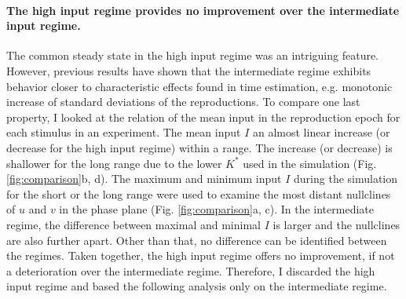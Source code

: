 \documentclass[10pt]{article}
\begin{document}
\paragraph{The high input regime provides no improvement over the intermediate input regime.}
The common steady state in the high input regime was an intriguing feature.
However, previous results have shown that the intermediate regime exhibits behavior closer to characteristic effects found in time estimation, e.g. monotonic increase of standard deviations of the reproductions. 
To compare one last property, I looked at the relation of the mean input in the reproduction epoch for each stimulus in an experiment.
The mean input $I$ an almost linear increase (or decrease for the high input regime) within a range. The increase (or decrease) is shallower for the long range due to the lower $K^*$ used in the simulation (Fig. \ref{fig:comparison}b, d).
The maximum and minimum input $I$ during the simulation for the short or the long range were used to examine the most distant nullclines of $u$ and $v$ in the phase plane (Fig. \ref{fig:comparison}a, c). 
In the intermediate regime, the difference between maximal and minimal $I$ is larger and the nullclines are also further apart. Other than that, no difference can be identified between the regimes. 
Taken together, the high input regime offers no improvement, if not a deterioration over the intermediate regime. Therefore, I discarded the high input regime and based the following analysis only on the intermediate regime. 
\end{document}
